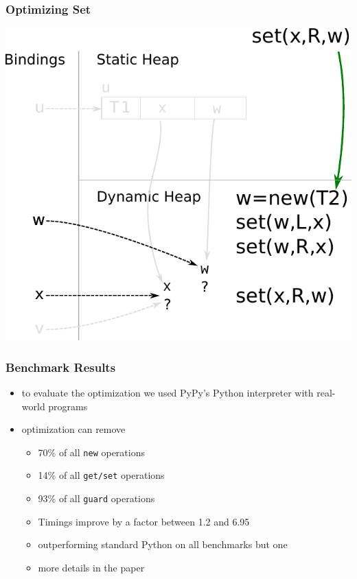 \documentclass[utf8x]{beamer}
\begin{document}
\begin{frame}[plain]
  \frametitle{Optimizing Set}
  \includegraphics[scale=0.8]{figures/opt_set_dynamic2}
\end{frame}

\begin{frame}
  \frametitle{Benchmark Results}
  \begin{itemize}
      \item to evaluate the optimization we used PyPy's Python interpreter with real-world programs
      \item optimization can remove
      \begin{itemize}
          \item 70\% of all \texttt{new} operations
          \item 14\% of all \texttt{get/set} operations
          \item 93\% of all \texttt{guard} operations
      \pause
      \item Timings improve by a factor between 1.2 and 6.95
      \item outperforming standard Python on all benchmarks but one
      \pause
      \item more details in the paper
      \end{itemize}
  \end{itemize}
\end{frame}
\end{document}

